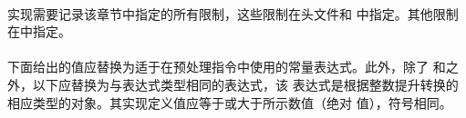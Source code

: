 \paragraph{}
实现需要记录该章节中指定的所有限制，这些限制在头文件和
中指定。其他限制在中指定。


\paragraph{}
下面给出的值应替换为适于在预处理指令中使用的常量表达式。此外，除了
和之外，以下应替换为与表达式类型相同的表达式，该
表达式是根据整数提升转换的相应类型的对象。其实现定义值应等于或大于所示数值（绝对
值），符号相同。
